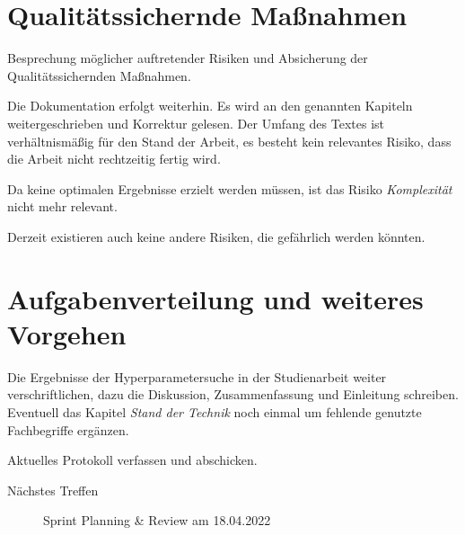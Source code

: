 \section{Qualitätssichernde Maßnahmen}
Besprechung möglicher auftretender Risiken und Absicherung der Qualitätssichernden Maßnahmen.
\begin{description}[style=nextline]
	\item[Review und Dokumentation \hfill \fullcheck]
	Die Dokumentation erfolgt weiterhin.
	Es wird an den genannten Kapiteln weitergeschrieben und Korrektur gelesen.
	Der Umfang des Textes ist verhältnismäßig für den Stand der Arbeit, es besteht kein relevantes Risiko, dass die Arbeit nicht rechtzeitig fertig wird.
	
	\item[Risikoanalyse \hfill \fullcheck]
	Da keine optimalen Ergebnisse erzielt werden müssen, ist das Risiko \textit{Komplexität} nicht mehr relevant.
	
	Derzeit existieren auch keine andere Risiken, die gefährlich werden könnten.
	
	
	
\end{description}

\section{Aufgabenverteilung und weiteres Vorgehen}
\begin{description}[style=nextline]
	\item[Studienarbeit verschriftlichen \todoperson{Jonas, Patrick}] 
	Die Ergebnisse der Hyperparametersuche in der Studienarbeit weiter verschriftlichen, dazu die Diskussion, Zusammenfassung und Einleitung schreiben.
	Eventuell das Kapitel \textit{Stand der Technik} noch einmal um fehlende genutzte Fachbegriffe ergänzen.
	
	\item[Protokoll \todoperson{Jonas}]
	Aktuelles Protokoll verfassen und abschicken.
\end{description}
\begin{description}
	\item[Nächstes Treffen] Sprint Planning \& Review am 18.04.2022
\end{description}

